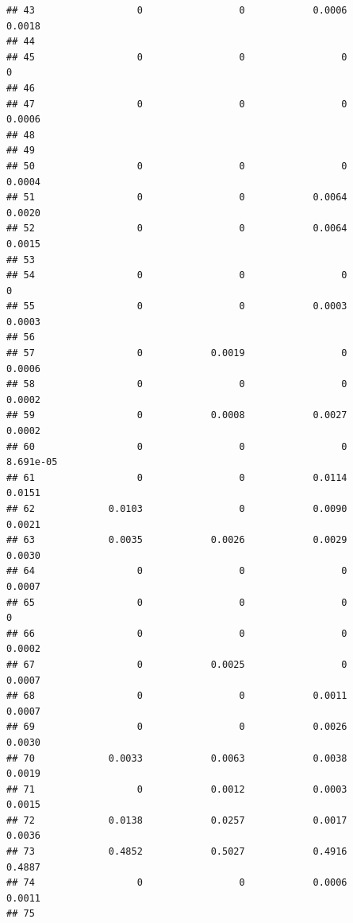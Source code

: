 \documentclass[
]{article}
\begin{document}
\begin{verbatim}
## 43                  0                 0            0.0006            0.0018
## 44                                                                         
## 45                  0                 0                 0                 0
## 46                                                                         
## 47                  0                 0                 0            0.0006
## 48                                                                         
## 49                                                                         
## 50                  0                 0                 0            0.0004
## 51                  0                 0            0.0064            0.0020
## 52                  0                 0            0.0064            0.0015
## 53                                                                         
## 54                  0                 0                 0                 0
## 55                  0                 0            0.0003            0.0003
## 56                                                                         
## 57                  0            0.0019                 0            0.0006
## 58                  0                 0                 0            0.0002
## 59                  0            0.0008            0.0027            0.0002
## 60                  0                 0                 0         8.691e-05
## 61                  0                 0            0.0114            0.0151
## 62             0.0103                 0            0.0090            0.0021
## 63             0.0035            0.0026            0.0029            0.0030
## 64                  0                 0                 0            0.0007
## 65                  0                 0                 0                 0
## 66                  0                 0                 0            0.0002
## 67                  0            0.0025                 0            0.0007
## 68                  0                 0            0.0011            0.0007
## 69                  0                 0            0.0026            0.0030
## 70             0.0033            0.0063            0.0038            0.0019
## 71                  0            0.0012            0.0003            0.0015
## 72             0.0138            0.0257            0.0017            0.0036
## 73             0.4852            0.5027            0.4916            0.4887
## 74                  0                 0            0.0006            0.0011
## 75                                                                         

\end{verbatim}
\end{document}
